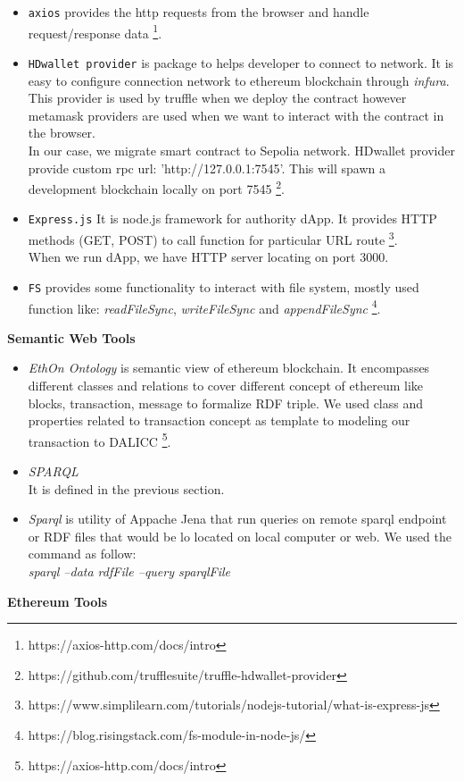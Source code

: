 \begin{itemize}
\item \texttt{axios} provides the http requests from the browser and handle request/response data \footnote{https://axios-http.com/docs/intro}. \\
\item \texttt{HDwallet provider} is package to helps developer to connect to network. It is easy to configure connection network to ethereum blockchain through \textit{infura}. This provider is used by truffle when we deploy the contract however metamask providers are used when we want to interact with the contract in the browser.\\
In our case, we migrate smart contract to Sepolia network.
HDwallet provider provide custom rpc url: 'http://127.0.0.1:7545'. This will spawn a development blockchain locally on port 7545 \footnote{https://github.com/trufflesuite/truffle-hdwallet-provider}. \\
\item \texttt{Express.js} It is node.js framework for authority dApp. It provides HTTP methods (GET, POST) to call function for particular URL route \footnote{https://www.simplilearn.com/tutorials/nodejs-tutorial/what-is-express-js}. \\ 
When we run dApp, we have HTTP server locating on port 3000. \\
\item \texttt{FS} provides some functionality to interact with file system, mostly used function like: \textit{readFileSync}, \textit{writeFileSync} and \textit{appendFileSync} \footnote{https://blog.risingstack.com/fs-module-in-node-js/}. \\
\end{itemize}

\textbf{Semantic Web Tools}\\
\begin{itemize}
	\item \textit{EthOn Ontology} is semantic view of ethereum blockchain. It encompasses different classes and relations to cover different concept of ethereum like blocks, transaction, message to formalize RDF triple. We used class and properties related to transaction concept as template to modeling our transaction to DALICC \footnote{https://axios-http.com/docs/intro}.
	\item \textit{SPARQL}\\
	It is defined in the previous section.
	\item \textit{Sparql} is utility of Appache Jena that run queries on remote sparql endpoint or RDF files that would be lo located on local computer or web. We used the command as follow:\\
	\textit{sparql --data rdfFile --query sparqlFile}
	
\end{itemize}
\textbf{Ethereum Tools}

